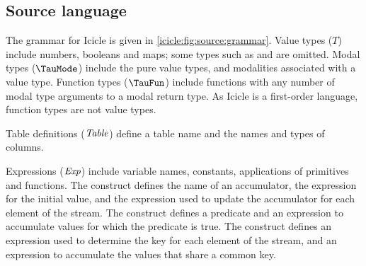 
\subsection{Source language}
\label{icicle:s:IcicleSource}

The grammar for Icicle is given in \cref{icicle:fig:source:grammar}.
Value types ($T$) include numbers, booleans and maps; some types such as \Ic@Real@ and \Ic@String@ are omitted.
Modal types ($\TauMode$) include the pure value types, and modalities associated with a value type.
Function types ($\TauFun$) include functions with any number of modal type arguments to a modal return type.
As Icicle is a first-order language, function types are not value types.


Table definitions ($\mathit{Table}$) define a table name and the names and types of columns.

Expressions ($\mathit{Exp}$) include variable names, constants, applications of primitives and functions.
The \Ic@fold@ construct defines the name of an accumulator, the expression for the initial value, and the expression used to update the accumulator for each element of the stream.
The \Ic@filter@ construct defines a predicate and an expression to accumulate values for which the predicate is true.
The \Ic@group@ construct defines an expression used to determine the key for each element of the stream, and an expression to accumulate the values that share a common key.

